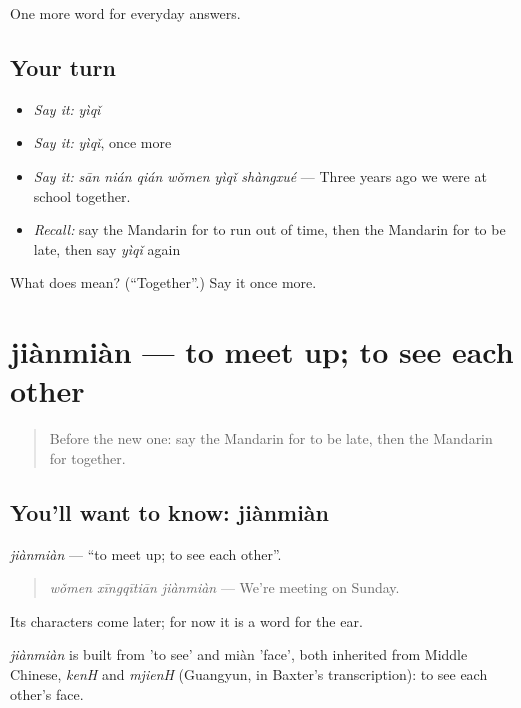 \begin{grammarlens}[title={What you've built}]
One more word for everyday answers.
\end{grammarlens}

\subsection*{Your turn}
\begin{itemize}
\raggedright
  \item \emph{Say it:} \emph{yìqǐ}
  \item \emph{Say it:} \emph{yìqǐ}, once more
  \item \emph{Say it:} \emph{sān nián qián wǒmen yìqǐ shàngxué} — Three years ago we were at school together.
  \item \emph{Recall:} say the Mandarin for to run out of time, then the Mandarin for to be late, then say \emph{yìqǐ} again
\end{itemize}

\begin{tcolorbox}[breakable,colback=teal!4,colframe=teal!35!black,title={Before you move on}]
What does  mean? (\textquotedblleft{}Together\textquotedblright{}.) Say it once more.
\end{tcolorbox}
\section[jiànmiàn]{jiànmiàn — to meet up; to see each other}

\label{lesson:ZH-C84-jianmian}



\begin{quote}
Before the new one: say the Mandarin for to be late, then the Mandarin for together.
\end{quote}

\subsection*{You'll want to know: jiànmiàn}
\emph{jiànmiàn} — \textquotedblleft{}to meet up; to see each other\textquotedblright{}.

\begin{quote}
\emph{wǒmen xīngqītiān jiànmiàn} — We're meeting on Sunday.
\end{quote}

Its characters come later; for now it is a word for the ear.

\begin{cousinweb}
\emph{jiànmiàn} is built from  'to see' and miàn 'face', both inherited from Middle Chinese, \emph{kenH} and \emph{mjienH} (Guangyun, in Baxter's transcription): to see each other's face.
\end{cousinweb}

